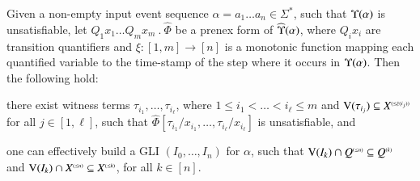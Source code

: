 \documentclass{llncs}
\begin{document}
\begin{lemma}\label{lemma:subst-quant}
  Given a non-empty input event sequence $\alpha = a_1 \ldots a_n \in
  \Sigma^*$, such that $\Upsilon({\alpha})$ is unsatisfiable, let
  $Q_1x_1 \ldots Q_mx_m ~.~ \widehat{\Phi}$ be a prenex form of
  $\widehat{\Upsilon}({\alpha})$, where $Q_ix_i$ are transition quantifiers and
  $\xi : [1,m] \rightarrow [n]$ is a monotonic function mapping each
  quantified variable to the time-stamp of the step where it occurs in
  $\Upsilon({\alpha})$. Then the following hold: \begin{compactenum}
  \item\label{it1:subst-quant} there exist witness terms $\tau_{i_1},
    \ldots, \tau_{i_\ell}$, where $1 \leq i_1 < \ldots < i_\ell \leq
    m$ and $\mathrm{V}({\tau_{i_j}}) \subseteq {X}^{\scriptscriptstyle{({\leq \xi(i_j)})}}$ for
    all $j \in [1,\ell]$, such that $\widehat{\Phi}[\tau_{i_1}/x_{i_1},
      \ldots, \tau_{i_\ell}/x_{i_\ell}]$ is unsatisfiable, and
  \item\label{it2:subst-quant} one can effectively build a GLI $(I_0,
    \ldots, I_n)$ for $\alpha$, such that $\mathrm{V}({I_k}) \cap
    {Q}^{\scriptscriptstyle{({\leq n})}} \subseteq {Q}^{\scriptscriptstyle{({k})}}$ and $\mathrm{V}({I_k}) \cap
    {X}^{\scriptscriptstyle{({\leq n})}} \subseteq {X}^{\scriptscriptstyle{({\leq k})}}$, for all $k \in
          [n]$.
  \end{compactenum}
\end{lemma}
\end{document}
